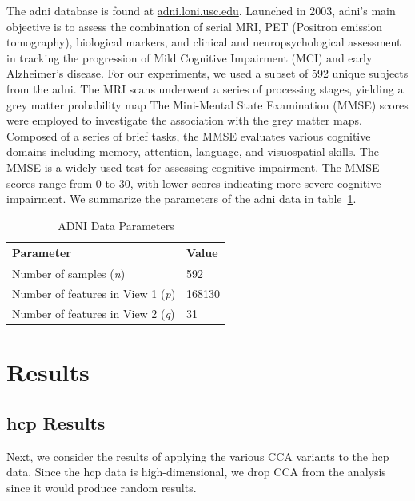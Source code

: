 The \acrshort{adni} database is found at \url{adni.loni.usc.edu}.
Launched in 2003, \acrshort{adni}'s main objective is to assess the combination of serial MRI, PET (Positron emission tomography), biological markers, and clinical and neuropsychological assessment in tracking the progression of Mild Cognitive Impairment (MCI) and early Alzheimer’s disease.
For our experiments, we used a subset of 592 unique subjects from the \acrshort{adni}. The MRI scans underwent a series of processing stages, yielding a grey matter probability map
The Mini-Mental State Examination (MMSE) scores were employed to investigate the association with the grey matter maps.
Composed of a series of brief tasks, the MMSE evaluates various cognitive domains including memory, attention, language, and visuospatial skills.
The MMSE is a widely used test for assessing cognitive impairment.
The MMSE scores range from 0 to 30, with lower scores indicating more severe cognitive impairment.
We summarize the parameters of the \acrshort{adni} data in table~\ref{tab:adni-parameters}.

\begin{table}
    \centering
    \caption{ADNI Data Parameters}
    \begin{tabular}{| l | l |}
        \hline
        \textbf{Parameter}                        & \textbf{Value} \\
        \hline
        Number of samples (\textit{n})            & 592            \\
        Number of features in View 1 (\textit{p}) & 168130         \\
        Number of features in View 2 (\textit{q}) & 31             \\
        \hline
    \end{tabular}\label{tab:adni-parameters}
\end{table}


\section{Results}

\subsection{\acrshort{hcp} Results}

Next, we consider the results of applying the various CCA variants to the \acrshort{hcp} data.
Since the \acrshort{hcp} data is high-dimensional, we drop CCA from the analysis since it would produce random results.

